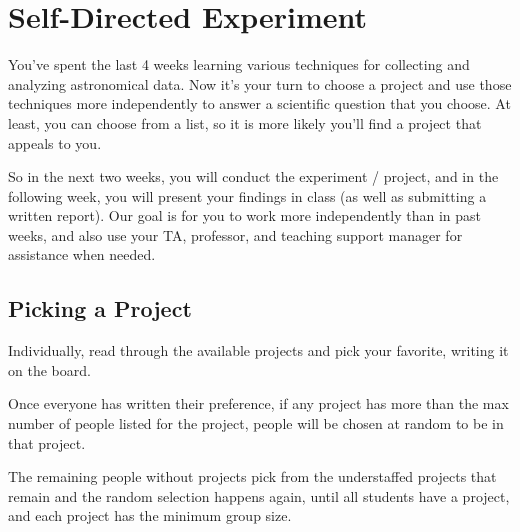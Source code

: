\chapter{Self-Directed Experiment}

You've spent the last 4 weeks learning various techniques for collecting and analyzing astronomical data. Now it's your turn to choose a project and use those techniques more independently to answer a scientific question that you choose. At least, you can choose from a list, so it is more likely you'll find a project that appeals to you.

So in the next two weeks, you will conduct the experiment / project, and in the following week, you will present your findings in class (as well as submitting a written report). Our goal is for you to work more independently than in past weeks, and also use your TA, professor, and teaching support manager for assistance when needed.

\section{Picking a Project}

\begin{steps}
	\item Individually, read through the available projects and pick your favorite, writing it on the board.
	
	\item Once everyone has written their preference, if any project has more than the max number of people listed for the project, people will be chosen at random to be in that project.
	
	\item The remaining people without projects pick from the understaffed projects that remain and the random selection happens again, until all students have a project, and each project has the minimum group size.
\end{steps}

%
%

